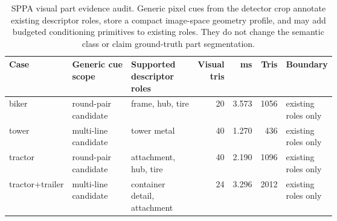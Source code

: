 \begin{table}[H]
\centering
\footnotesize
\setlength{\tabcolsep}{3pt}
\renewcommand{\arraystretch}{1.08}
\caption{SPPA visual part evidence audit. Generic pixel cues from the detector crop annotate existing descriptor roles, store a compact image-space geometry profile, and may add budgeted conditioning primitives to existing roles. They do not change the semantic class or claim ground-truth part segmentation.}
\label{tab:sppa-visual-part-evidence}
\begin{tabularx}{\linewidth}{@{}L{0.15\linewidth}L{0.23\linewidth}L{0.25\linewidth}r r r Y@{}}
\toprule
Case & Generic cue scope & Supported descriptor roles & Visual tris & ms & Tris & Boundary \\
\midrule
biker & round-pair candidate & frame, hub, tire & 20 & 3.573 & 1056 & existing roles only \\
tower & multi-line candidate & tower metal & 40 & 1.270 & 436 & existing roles only \\
tractor & round-pair candidate & attachment, hub, tire & 40 & 2.190 & 1096 & existing roles only \\
tractor+trailer & multi-line candidate & container detail, attachment & 24 & 3.296 & 2012 & existing roles only \\
\bottomrule
\end{tabularx}
\end{table}
